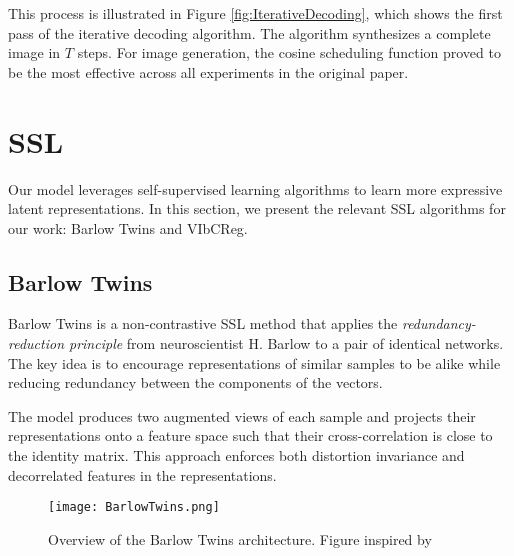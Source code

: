 \documentclass[../../thesis.tex]{subfiles}
\begin{document}
This process is illustrated in Figure \ref{fig:IterativeDecoding}, which shows the first pass of the iterative decoding algorithm. The algorithm synthesizes a complete image in $T$ steps. For image generation, the cosine scheduling function proved to be the most effective across all experiments in the original paper.



\section{SSL}
Our model leverages self-supervised learning algorithms to learn more expressive latent representations. In this section, we present the relevant SSL algorithms for our work: Barlow Twins and VIbCReg.


\subsection{Barlow Twins}

Barlow Twins is a non-contrastive SSL method that applies the \textit{redundancy-reduction principle} \cite{Barlow_origin} from neuroscientist H. Barlow to a pair of identical networks. The key idea is to encourage representations of similar samples to be alike while reducing redundancy between the components of the vectors.\newline

The model produces two augmented views of each sample and projects their representations onto a feature space such that their cross-correlation is close to the identity matrix. This approach enforces both distortion invariance and decorrelated features in the representations.\newline

\begin{figure}[h]
    \texttt{[image: BarlowTwins.png]}
    \centering    
    \caption{Overview of the Barlow Twins architecture. Figure inspired by \cite{zbontar2021barlow}}
    \label{fig:BarlowTwins}
\end{figure}
\end{document}
